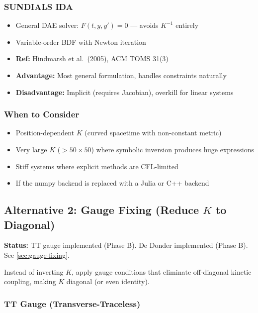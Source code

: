\subsubsection{SUNDIALS IDA}
\label{sec:kinetic-ida}

\begin{itemize}
  \item General DAE solver: $F(t, y, y') = 0$ --- avoids $K^{-1}$ entirely
  \item Variable-order BDF with Newton iteration
  \item \textbf{Ref:} Hindmarsh et al.\ (2005), ACM TOMS 31(3)
  \item \textbf{Advantage:} Most general formulation, handles constraints naturally
  \item \textbf{Disadvantage:} Implicit (requires Jacobian), overkill for linear systems
\end{itemize}

\subsubsection{When to Consider}
\label{sec:kinetic-alt1-when}

\begin{itemize}
  \item Position-dependent $K$ (curved spacetime with non-constant metric)
  \item Very large $K$ ($>50\times 50$) where symbolic inversion produces huge expressions
  \item Stiff systems where explicit methods are CFL-limited
  \item If the numpy backend is replaced with a Julia or C++ backend
\end{itemize}


\subsection{Alternative 2: Gauge Fixing (Reduce $K$ to Diagonal)}
\label{sec:kinetic-alt2}

\textbf{Status:} TT gauge implemented (Phase B). De Donder implemented (Phase B). See \cref{sec:gauge-fixing}.

Instead of inverting $K$, apply gauge conditions that eliminate off-diagonal kinetic coupling, making $K$ diagonal (or even identity).

\subsubsection{TT Gauge (Transverse-Traceless)}
\label{sec:kinetic-tt}

